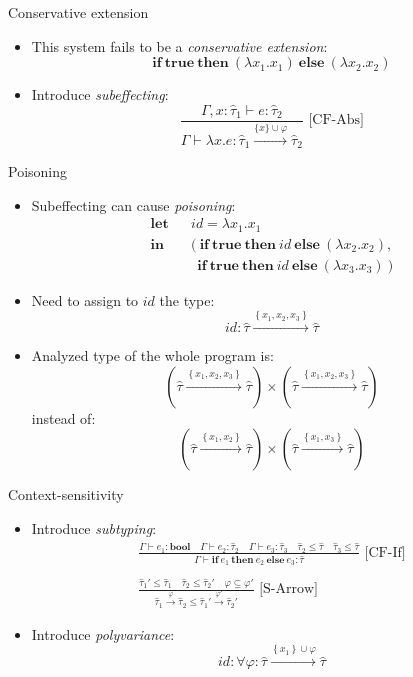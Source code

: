 \documentclass{beamer}
\newcommand{\Abs}[2]{\lambda #1.#2}
\newcommand{\BTrue}{\mathbf{true}}
\newcommand{\ITE}[3]{\mathbf{if}\ #1\ \mathbf{then}\ #2\ \mathbf{else}\ #3}
\newcommand{\TBool}{\mathbf{bool}}
\newcommand{\AFun}[3]{#1 \xrightarrow{#2} #3}
\newcommand{\TPair}[2]{#1 \times #2}
\newcommand{\Rule}[3]{\frac{#2}{#3}\text{\ [#1]}}
\newcommand{\Judge}[3][\Gamma]{#1 \vdash #2 : #3}
\newcommand{\tauhat}{\widehat\tau}
\begin{document}
\begin{frame}{Conservative extension}
	\begin{itemize}
		\item This system fails to be a \emph{conservative extension}: \[\ITE{\BTrue}{\left(\Abs{x_1}{x_1}\right)}{\left(\Abs{x_2}{x_2}\right)}\]
		\pause
		\item Introduce \emph{subeffecting}: \[				\Rule{CF-Abs}
					 {\Judge[\Gamma, x : \tauhat_1]{e}{\tauhat_2}}
					 {\Judge{\Abs{x}{e}}{\AFun{\tauhat_1}{\{x\} \cup \varphi}{\tauhat_2}}} \]
	\end{itemize}
\end{frame}

\begin{frame}{Poisoning}
	\begin{itemize}
		\item Subeffecting can cause \emph{poisoning}:
		\begin{eqnarray*}
			\mathbf{let} &&id = \Abs{x_1}{x_1}\\
			\mathbf{in}  &&(\ \ITE{\BTrue}{id}{\left(\Abs{x_2}{x_2}\right)},\\
			             &&\ \ \ITE{\BTrue}{id}{\left(\Abs{x_3}{x_3}\right)}\ )
		\end{eqnarray*}
		\item Need to assign to $id$ the type: \[ id : \AFun{\tauhat}{\left\{x_1,x_2,x_3\right\}}{\tauhat} \]
		\item Analyzed type of the whole program is: \[ \TPair{\left(\AFun{\tauhat}{\left\{x_1,x_2,x_3\right\}}{\tauhat}\right)}{\left(\AFun{\tauhat}{\left\{x_1,x_2,x_3\right\}}{\tauhat}\right)} \] instead of: \[ \TPair{\left(\AFun{\tauhat}{\left\{x_1,x_2\right\}}{\tauhat}\right)}{\left(\AFun{\tauhat}{\left\{x_1,x_3\right\}}{\tauhat}\right)} \]
	\end{itemize}
\end{frame}

\begin{frame}{Context-sensitivity}
	\begin{itemize}
		\item Introduce \emph{subtyping}:
			\begin{gather*}
				\Rule{CF-If}
			   		 {\Judge{e_1}{\TBool}\quad\Judge{e_2}{\tauhat_2}\quad\Judge{e_3}{\tauhat_3}\quad\tauhat_2 \leq \tauhat\quad\tauhat_3\leq\tauhat}
			   		 {\Judge{\ITE{e_1}{e_2}{e_3}}{\tauhat}}\\\\
				\Rule{S-Arrow}
					 {\tauhat_1' \leq \tauhat_1 \quad \tauhat_2 \leq \tauhat_2' \quad \varphi \subseteq \varphi'}
					 {\AFun{\tauhat_1}{\varphi}{\tauhat_2} \leq \AFun{\tauhat_1'}{\varphi'}{\tauhat_2'}}
			\end{gather*}
		\pause
		\item Introduce \emph{polyvariance}: \[ id : \forall \varphi : \AFun{\tauhat}{\left\{x_1\right\} \cup \varphi}{\tauhat} \]
	\end{itemize}
\end{frame}
\end{document}
